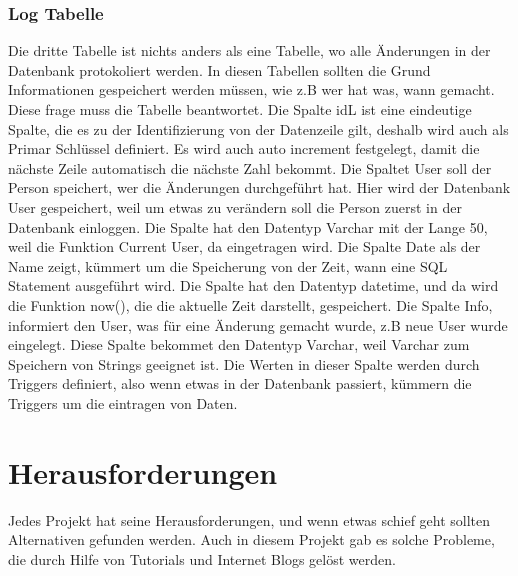 \subsubsection{Log Tabelle}
Die dritte Tabelle ist nichts anders als eine Tabelle, wo alle Änderungen in der Datenbank protokoliert werden. In diesen Tabellen sollten die Grund Informationen gespeichert werden müssen, wie z.B wer hat was, wann gemacht. Diese frage muss die Tabelle beantwortet.
\bigbreak
Die Spalte idL ist eine eindeutige Spalte, die es zu der Identifizierung von der Datenzeile gilt, deshalb wird auch als Primar Schlüssel definiert. Es wird auch auto increment festgelegt, damit die nächste Zeile automatisch die nächste Zahl bekommt.
\bigbreak
Die Spaltet User soll der Person speichert, wer die Änderungen durchgeführt hat. Hier wird der Datenbank User gespeichert, weil um etwas zu verändern soll die Person zuerst in der Datenbank einloggen. Die Spalte hat den Datentyp Varchar mit der Lange 50, weil die Funktion Current User, da eingetragen wird.
\bigbreak
Die Spalte Date als der Name zeigt, kümmert um die Speicherung von der Zeit, wann eine SQL Statement ausgeführt wird. Die Spalte hat den Datentyp datetime, und da wird die Funktion now(), die die aktuelle Zeit darstellt, gespeichert.
\bigbreak
Die Spalte Info, informiert den User, was für eine Änderung gemacht wurde, z.B neue User wurde eingelegt. Diese Spalte bekommet den Datentyp Varchar, weil Varchar zum Speichern von Strings geeignet ist. Die Werten in dieser Spalte werden durch Triggers definiert, also wenn etwas in der Datenbank passiert, kümmern die Triggers um die eintragen von Daten.
\newpage
\section{Herausforderungen}
Jedes Projekt hat seine Herausforderungen, und wenn etwas schief geht sollten Alternativen gefunden werden. Auch in diesem Projekt gab es solche Probleme, die durch Hilfe von Tutorials und Internet Blogs gelöst werden.
